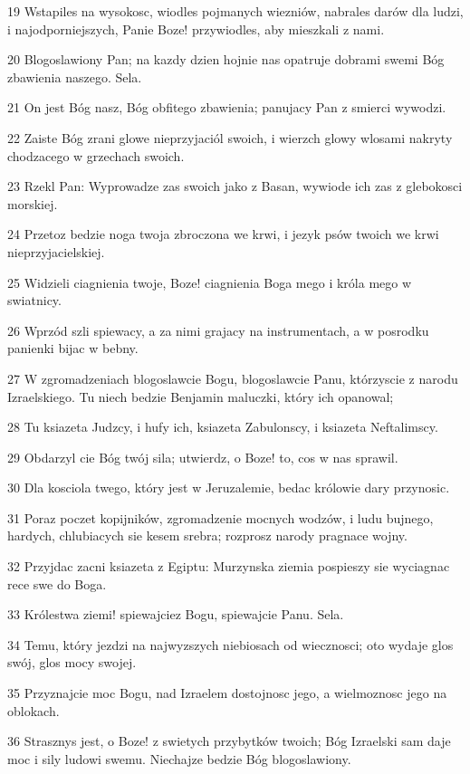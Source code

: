 \par 19 Wstapiles na wysokosc, wiodles pojmanych wiezniów, nabrales darów dla ludzi, i najodporniejszych, Panie Boze! przywiodles, aby mieszkali z nami.
\par 20 Blogoslawiony Pan; na kazdy dzien hojnie nas opatruje dobrami swemi Bóg zbawienia naszego. Sela.
\par 21 On jest Bóg nasz, Bóg obfitego zbawienia; panujacy Pan z smierci wywodzi.
\par 22 Zaiste Bóg zrani glowe nieprzyjaciól swoich, i wierzch glowy wlosami nakryty chodzacego w grzechach swoich.
\par 23 Rzekl Pan: Wyprowadze zas swoich jako z Basan, wywiode ich zas z glebokosci morskiej.
\par 24 Przetoz bedzie noga twoja zbroczona we krwi, i jezyk psów twoich we krwi nieprzyjacielskiej.
\par 25 Widzieli ciagnienia twoje, Boze! ciagnienia Boga mego i króla mego w swiatnicy.
\par 26 Wprzód szli spiewacy, a za nimi grajacy na instrumentach, a w posrodku panienki bijac w bebny.
\par 27 W zgromadzeniach blogoslawcie Bogu, blogoslawcie Panu, którzyscie z narodu Izraelskiego. Tu niech bedzie Benjamin maluczki, który ich opanowal;
\par 28 Tu ksiazeta Judzcy, i hufy ich, ksiazeta Zabulonscy, i ksiazeta Neftalimscy.
\par 29 Obdarzyl cie Bóg twój sila; utwierdz, o Boze! to, cos w nas sprawil.
\par 30 Dla kosciola twego, który jest w Jeruzalemie, bedac królowie dary przynosic.
\par 31 Poraz poczet kopijników, zgromadzenie mocnych wodzów, i ludu bujnego, hardych, chlubiacych sie kesem srebra; rozprosz narody pragnace wojny.
\par 32 Przyjdac zacni ksiazeta z Egiptu: Murzynska ziemia pospieszy sie wyciagnac rece swe do Boga.
\par 33 Królestwa ziemi! spiewajciez Bogu, spiewajcie Panu. Sela.
\par 34 Temu, który jezdzi na najwyzszych niebiosach od wiecznosci; oto wydaje glos swój, glos mocy swojej.
\par 35 Przyznajcie moc Bogu, nad Izraelem dostojnosc jego, a wielmoznosc jego na oblokach.
\par 36 Strasznys jest, o Boze! z swietych przybytków twoich; Bóg Izraelski sam daje moc i sily ludowi swemu. Niechajze bedzie Bóg blogoslawiony.

